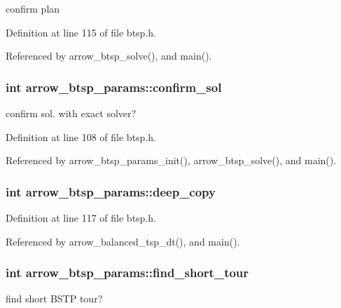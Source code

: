 confirm plan 

Definition at line 115 of file btsp.h.

Referenced by arrow\_\-btsp\_\-solve(), and main().\hypertarget{structarrow__btsp__params_2c579feb3ff41f4d73b5de97596fe465}{
\subsubsection[{confirm\_\-sol}]{\setlength{\rightskip}{0pt plus 5cm}int {\bf arrow\_\-btsp\_\-params::confirm\_\-sol}}}
\label{structarrow__btsp__params_2c579feb3ff41f4d73b5de97596fe465}


confirm sol. with exact solver? 

Definition at line 108 of file btsp.h.

Referenced by arrow\_\-btsp\_\-params\_\-init(), arrow\_\-btsp\_\-solve(), and main().\hypertarget{structarrow__btsp__params_9f41e1fdf1d45581136187929ca57615}{
\subsubsection[{deep\_\-copy}]{\setlength{\rightskip}{0pt plus 5cm}int {\bf arrow\_\-btsp\_\-params::deep\_\-copy}}}
\label{structarrow__btsp__params_9f41e1fdf1d45581136187929ca57615}




Definition at line 117 of file btsp.h.

Referenced by arrow\_\-balanced\_\-tsp\_\-dt(), and main().\hypertarget{structarrow__btsp__params_f5fd677200b64930838c6905cbada990}{
\subsubsection[{find\_\-short\_\-tour}]{\setlength{\rightskip}{0pt plus 5cm}int {\bf arrow\_\-btsp\_\-params::find\_\-short\_\-tour}}}
\label{structarrow__btsp__params_f5fd677200b64930838c6905cbada990}


find short BSTP tour? 

